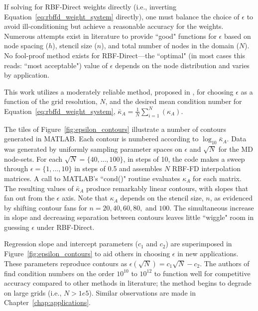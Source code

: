 \documentclass[11pt]{report}
\begin{document}
{%

If solving for RBF-Direct weights directly (i.e., inverting Equation~\ref{eq:rbffd_weight_system} directly), one must balance the choice of $\epsilon$ to avoid ill-conditioning but achieve a reasonable accuracy for the weights. Numerous attempts exist in literature to provide ``good" functions for $\epsilon$ based on node spacing ($h$), stencil size ($n$), and total number of nodes in the domain ($N$). 
No fool-proof method exists for RBF-Direct---the ``optimal" (in most cases this reads: ``most acceptable") value of $\epsilon$ depends on the node distribution and varies by application. 

This work utilizes a moderately reliable method, proposed in \cite{FlyerLehto11}, for choosing $\epsilon$ as a function of the grid resolution, $N$, and the desired mean condition number for Equation~\ref{eq:rbffd_weight_system}, $\bar{\kappa}_A = \frac{1}{N} \sum_{i=1}^N(\kappa_A)$. %

The tiles of Figure~\ref{fig:epsilon_contours} illustrate a number of contours generated in MATLAB. Each contour is numbered according to $\log_{10}\bar{\kappa}_A$. Data was generated by uniformly sampling parameter spaces on $\epsilon$ and $\sqrt{N}$ for the MD node-sets. For each $\sqrt{N} = \{40, ..., 100\}$, in steps of 10, the code makes a sweep through $\epsilon = \{1, ..., 10\}$ in steps of 0.5 and assembles $N$ RBF-FD interpolation matrices. A call to MATLAB's ``cond()" routine evaluates $\kappa_A$ for each matrix. The resulting values of $\bar{\kappa}_A$ produce remarkably linear contours, with slopes that fan out from the $\epsilon$ axis. Note that $\kappa_A$ depends on the stencil size, $n$, as evidenced by shifting contour fans for $n=20, 40, 60, 80,$ and $100$. The simultaneous increase in slope and decreasing separation between contours leaves little ``wiggle" room in guessing $\epsilon$ under RBF-Direct. 

Regression slope and intercept parameters ($c_1$ and $c_2$) are superimposed in Figure~\ref{fig:epsilon_contours} to aid others in choosing $\epsilon$ in new applications. These parameters reproduce contours as $\epsilon(\sqrt{N}) = c_1 \sqrt{N} - c_2$.  The authors of \cite{FlyerLehto11} find condition numbers on the order $10^{10}$ to $10^{12}$ to function well for competitive accuracy compared to other methods in literature; the method begins to degrade on large grids (i.e., $N > 1e5$). Similar observations are made in Chapter~\ref{chap:applications}. 

}
\end{document}
